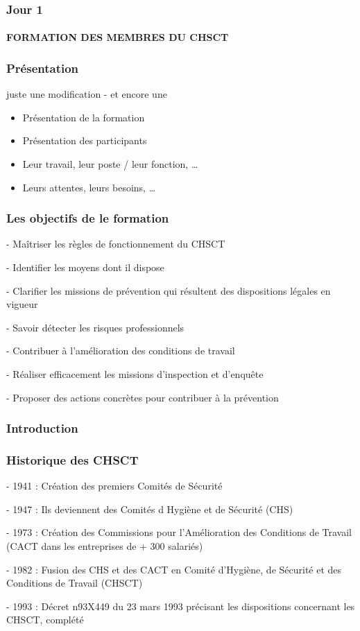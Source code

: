 \documentclass{beamer}
\begin{document}

\begin{frame}
\frametitle{Jour 1}
\framesubtitle{FORMATION DES MEMBRES DU CHSCT}
\end{frame}


\begin{frame}
\frametitle{Présentation}
juste une modification - et encore une
	\begin{itemize}
		\item Présentation de la formation
		\item Présentation des participants
        \item Leur travail, leur poste / leur fonction, …
        \item Leurs attentes, leurs besoins, …
	\end{itemize}
\end{frame}


\begin{frame}
\frametitle{Les objectifs de le formation}


- Maîtriser les règles de fonctionnement du CHSCT

- Identifier les moyens dont il dispose

- Clarifier les missions de prévention qui résultent des dispositions légales en vigueur

- Savoir détecter les risques professionnels

- Contribuer à l’amélioration des conditions de travail

- Réaliser efficacement les missions d’inspection et d’enquête

- Proposer des actions concrètes pour contribuer à la prévention

\end{frame}  


\begin{frame}
\frametitle{Introduction}
\end{frame} 


\begin{frame}
\frametitle{Historique des CHSCT}
- 1941 : Création des premiers Comités de Sécurité 

- 1947 : Ils deviennent des Comités d Hygiène et de Sécurité (CHS)

- 1973 : Création des Commissions pour l'Amélioration des Conditions  de Travail (CACT dans les entreprises de + 300 salariés)

- 1982 : Fusion des CHS et des CACT en Comité d'Hygiène, de Sécurité et des Conditions de Travail (CHSCT) 

- 1993 : Décret n93X449 du 23 mars 1993 précisant les dispositions concernant les CHSCT, complété
\end{frame} 
\end{document}
